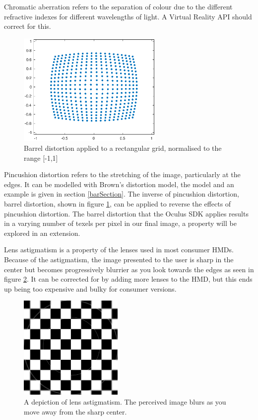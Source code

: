 \documentclass[12pt,a4paper,twoside,openright]{report}
\begin{document}
Chromatic aberration refers to the separation of colour due to the different refractive indexes for different wavelengths of light. A Virtual Reality API should correct for this.

\begin{figure}
\centerline{\includegraphics[width=7cm]{figs/post_distortion.eps}}
\caption{Barrel distortion applied to a rectangular grid, normalised to the range [-1,1]}
\label{barreldist}
\end{figure}

Pincushion distortion refers to the stretching of the image, particularly at the edges. It can be modelled with Brown's distortion model, the model and an example is given in section \ref{barSection}.  The inverse of pincushion distortion, barrel distortion, shown in figure \ref{barreldist}, can be applied to reverse the effects of pincushion distortion. The barrel distortion that the Oculus SDK\cite{oculus} applies results in a varying number of texels per pixel in our final image, a property will be explored in an extension.

Lens astigmatism is a property of the lenses used in most consumer HMDs. Because of the astigmatism, the image presented to the user is sharp in the center but becomes progressively blurrier as you look towards the edges as seen in figure \ref{blurred}. It can be corrected for by adding more lenses to the HMD, but this ends up being too expensive and bulky for consumer versions.

\begin{figure}
\centerline{\includegraphics[width=5cm]{figs/blur.png}}
\caption{A depiction of lens astigmatism. The perceived image blurs as you move away from the sharp center.}
\label{blurred}
\end{figure}
\end{document}
